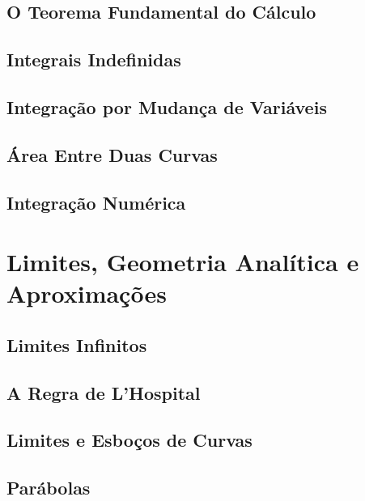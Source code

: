 \documentclass{svmono}
\begin{document}
\section{O Teorema Fundamental do Cálculo}
\label{sec:fundamentaltheo}

\section{Integrais Indefinidas}
\label{sec:indefiniteint}

\section{Integração por Mudança de Variáveis}
\label{sec:changevar}

\section{Área Entre Duas Curvas}
\label{sec:areacurves}

\section{Integração Numérica}
\label{sec:numericalint}

\chapterproblems

\chapter{Limites, Geometria Analítica e Aproximações}
\label{chp:limits}

\section{Limites Infinitos}
\label{sec:inflimits}

\section{A Regra de L'Hospital}
\label{sec:lhospital}

\section{Limites e Esboços de Curvas}
\label{sec:limsketch}

\section{Parábolas}
\label{sec:parabolas}
\end{document}
